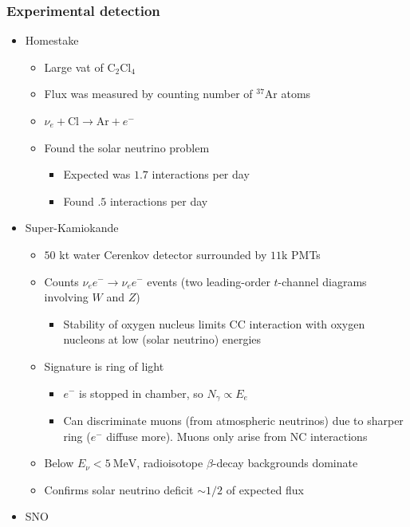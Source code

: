 \documentclass[11pt]{article}
\newcommand{\mev}{\text{MeV}}
\newcommand{\el}{\ensuremath{e^{-}}}
\begin{document}
\subsubsection{Experimental detection}
\begin{itemize}
  \item Homestake
  \begin{itemize}
    \item Large vat of $\text{C}_2\text{Cl}_4$
    \item Flux was measured by counting number of $^{37}\text{Ar}$ atoms
    \item $\nu_e+\text{Cl}\rightarrow \text{Ar}+\el$
    \item Found the solar neutrino problem
    \begin{itemize}
      \item Expected was $1.7$ interactions per day
      \item Found $.5$ interactions per day
    \end{itemize}
  \end{itemize}
  \item Super-Kamiokande
  \begin{itemize}
    \item $50$ kt water Cerenkov detector surrounded by $11$k PMTs
    \item Counts $\nu_e\el\rightarrow\nu_e\el$ events (two leading-order $t$-channel diagrams involving $W$ and $Z$)
    \begin{itemize}
      \item Stability of oxygen nucleus limits CC interaction with oxygen nucleons at low (solar neutrino) energies
    \end{itemize}
    \item Signature is ring of light
    \begin{itemize}
      \item $\el$ is stopped in chamber, so $N_\gamma \propto E_e$
      \item Can discriminate muons (from atmospheric neutrinos) due to sharper ring ($\el$ diffuse more). Muons only arise from NC interactions
    \end{itemize}
    \item Below $E_\nu < 5~\mev$, radioisotope $\beta$-decay backgrounds dominate
    \item Confirms solar neutrino deficit $\sim1/2$ of expected flux
  \end{itemize}
  \item SNO
  \begin{itemize}

\end{itemize}
\end{itemize}
\end{document}
